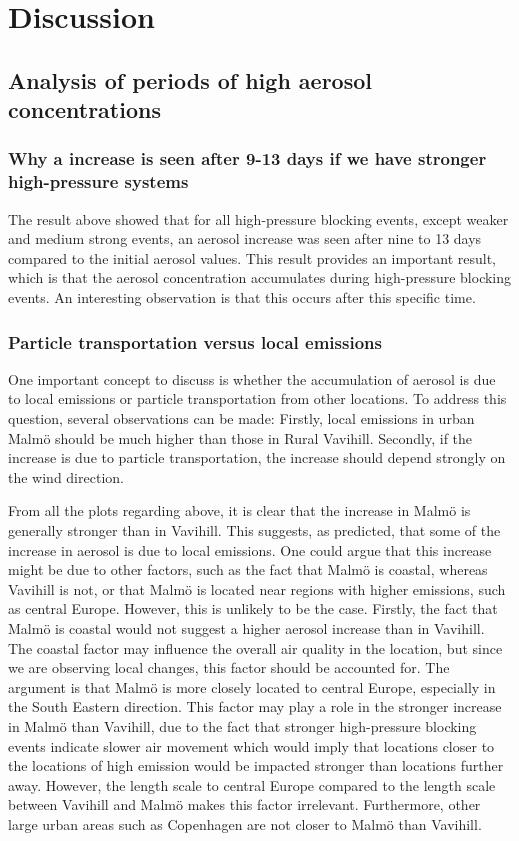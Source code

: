 \newpage
\section{Discussion}
\subsection{Analysis of periods of high aerosol concentrations}

\subsubsection{Why a increase is seen after 9-13 days if we have stronger high-pressure systems}
The result above showed that for all high-pressure blocking events, except weaker and medium strong events, an aerosol increase was seen after nine to 13 days compared to the initial aerosol values. This result provides an important result, which is that the aerosol concentration accumulates during high-pressure blocking events. An interesting observation is that this occurs after this specific time. 

\subsubsection{Particle transportation versus local emissions}
One important concept to discuss is whether the accumulation of aerosol is due to local emissions or particle transportation from other locations. To address this question, several observations can be made: Firstly, local emissions in urban Malmö should be much higher than those in Rural Vavihill. Secondly, if the increase is due to particle transportation, the increase should depend strongly on the wind direction. 

From all the plots regarding \PM above, it is clear that the increase in Malmö is generally stronger than in Vavihill. This suggests, as predicted, that some of the increase in aerosol is due to local emissions. One could argue that this increase might be due to other factors, such as the fact that Malmö is coastal, whereas Vavihill is not, or that Malmö is located near regions with higher emissions, such as central Europe. However, this is unlikely to be the case. Firstly, the fact that Malmö is coastal would not suggest a higher aerosol increase than in Vavihill. The coastal factor may influence the overall air quality in the location, but since we are observing local changes, this factor should be accounted for. The argument is that Malmö is more closely located to central Europe, especially in the South Eastern direction. This factor may play a role in the stronger increase in Malmö than Vavihill, due to the fact that stronger high-pressure blocking events indicate slower air movement which would imply  that locations closer to the locations of high emission would be impacted stronger than locations further away. However, the length scale to central Europe compared to the length scale between Vavihill and Malmö makes this factor irrelevant. Furthermore, other large urban areas such as Copenhagen are not closer to Malmö than Vavihill. 

